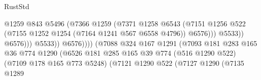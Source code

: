 \begin{lexlean}{RustStd}
\begin{coremodule}
                                                          @1259
                                                          @843
                                                          @5496
                                                          (@7366
                                                            @1259
                                                            (@7371
                                                              @1258
                                                              @6543
                                                              (@7151
                                                                @1256
                                                                @522
                                                                (@7155
                                                                  @1252
                                                                  @1254
                                                                  (@7164 @1241 @567 @6558 @4796))
                                                                @6576)))
                                                          @5533))
                                                      @6576)))
                                                @5533))
                                            @6576))))
                                    (@7088
                                      @324
                                      @167
                                      @1291
                                      (@7093
                                        @181
                                        @283
                                        @165
                                        @36
                                        @774
                                        @1290
                                        (@6526
                                          @181
                                          @285
                                          @165
                                          @39
                                          @774
                                          (@516 @1290 @522)
                                          (@7109 @178 @165 @773 @5248)
                                          (@7121
                                            @1290
                                            @522
                                            (@7127
                                              @1290
                                              (@7135
                                                @1289

\end{coremodule}
\end{lexlean}
